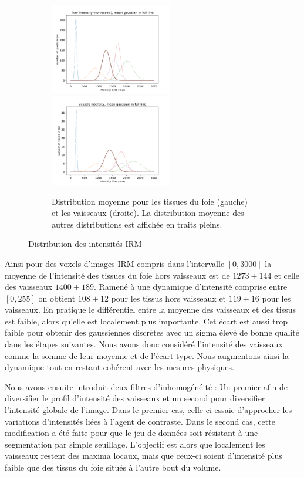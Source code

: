 \begin{figure}[h]
  \begin{subfigure}{\textwidth}
    \centering
    \includegraphics[height=4cm]{Images/gen_mri_liver_mean_intensity.pdf}
    \includegraphics[height=4cm]{Images/gen_mri_vessels_mean_intensity.pdf}
    \caption{Distribution moyenne pour les tissues du foie (gauche) et les vaisseaux (droite). La distribution moyenne des autres distributions est affichée en traits pleins.}
  
  \end{subfigure}
  \caption{Distribution des intensités IRM}
  \label{fig:Distributions_mri_intensities}
\end{figure}

Ainsi pour des voxels d'images IRM compris dans l'intervalle $[0,3000]$ la moyenne de l'intensité des tissues du foie hors vaisseaux est de $1273 \pm 144$ et celle des vaisseaux $1400 \pm 189$. Ramené à une dynamique d'intensité comprise entre $[0, 255]$ on obtient $108 \pm 12$ pour les tissus hors vaisseaux et $119 \pm 16$ pour les vaisseaux. En pratique le différentiel entre la moyenne des vaisseaux et des tissus est faible, alors qu'elle est localement plus importante. Cet écart est aussi trop faible pour obtenir des gaussiennes discrètes avec un sigma élevé de bonne qualité dans les étapes suivantes. Nous avons donc considéré l'intensité des vaisseaux comme la somme de leur moyenne et de l'écart type. Nous augmentons ainsi la dynamique tout en restant cohérent avec les mesures physiques.

Nous avons ensuite introduit deux filtres d'inhomogénéité : Un premier afin de diversifier le profil d'intensité des vaisseaux et un second pour diversifier l'intensité globale de l'image. Dans le premier cas, celle-ci essaie d'approcher les variations d'intensités liées à l'agent de contraste. Dans le second cas, cette modification a été faite pour que le jeu de données soit résistant à une segmentation par simple seuillage. L'objectif est alors que localement les vaisseaux restent des maxima locaux, mais que ceux-ci soient d'intensité plus faible que des tissus du foie situés à l'autre bout du volume.

